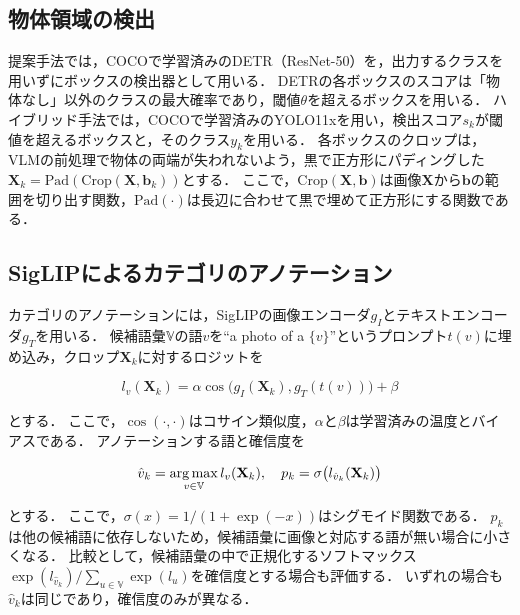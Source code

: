 \subsection{物体領域の検出}
提案手法では，COCOで学習済みのDETR（ResNet-50）\cite{ref_DETR}を，出力するクラスを用いずにボックスの検出器として用いる．
DETRの各ボックスのスコアは「物体なし」以外のクラスの最大確率であり，閾値$ \theta $を超えるボックスを用いる．
ハイブリッド手法では，COCOで学習済みのYOLO11x\cite{ref_YOLO11}を用い，検出スコア$ s_k $が閾値を超えるボックスと，そのクラス$ y_k $を用いる．
各ボックスのクロップは，VLMの前処理で物体の両端が失われないよう，黒で正方形にパディングした$ {\mathbf X}_k = \mathrm{Pad}(\mathrm{Crop}({\mathbf X}, {\mathbf b}_k)) $とする．
ここで，$ \mathrm{Crop}({\mathbf X}, {\mathbf b}) $は画像$ {\mathbf X} $から$ {\mathbf b} $の範囲を切り出す関数，$ \mathrm{Pad}(\cdot) $は長辺に合わせて黒で埋めて正方形にする関数である．

\subsection{SigLIPによるカテゴリのアノテーション}
カテゴリのアノテーションには，SigLIP\cite{ref_SigLIP}の画像エンコーダ$ g_I $とテキストエンコーダ$ g_T $を用いる．
候補語彙$ {\mathbb V} $の語$ v $を``a photo of a $ \{v\} $''というプロンプト$ t(v) $に埋め込み，クロップ$ {\mathbf X}_k $に対するロジットを

\begin{equation}
    l_v({\mathbf X}_k) = \alpha \cos \bigl( g_I({\mathbf X}_k), g_T(t(v)) \bigr) + \beta
    \label{eq_logit}
\end{equation}

\noindent
とする．
ここで，$ \cos(\cdot, \cdot) $はコサイン類似度，$ \alpha $と$ \beta $は学習済みの温度とバイアスである．
アノテーションする語と確信度を

\begin{equation}
    \hat{v}_k = \operatorname*{arg\,max}_{v \in {\mathbb V}} l_v({\mathbf X}_k), \quad
    p_k = \sigma \bigl( l_{\hat{v}_k}({\mathbf X}_k) \bigr)
    \label{eq_annotation}
\end{equation}

\noindent
とする．
ここで，$ \sigma(x) = 1 / (1 + \exp(-x)) $はシグモイド関数である．
$ p_k $は他の候補語に依存しないため，候補語彙に画像と対応する語が無い場合に小さくなる．
比較として，候補語彙の中で正規化するソフトマックス$ \exp(l_{\hat{v}_k}) / \sum_{u \in {\mathbb V}} \exp(l_u) $を確信度とする場合も評価する．
いずれの場合も$ \hat{v}_k $は同じであり，確信度のみが異なる．

